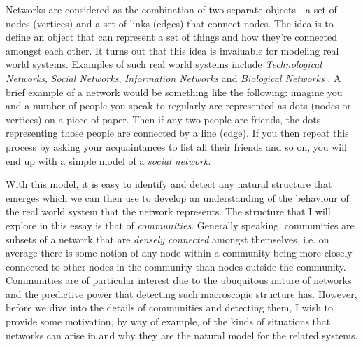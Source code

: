 Networks are considered as the combination of two separate objects - a set of nodes (vertices) and a set of links (edges) that connect nodes. The idea is to define an object that can represent a set of things and how they're connected amongst each other. It turns out that this idea is invaluable for modeling real world systems. Examples of such real world systems include \emph{Technological Networks}, \emph{Social Networks}, \emph{Information Networks} and \emph{Biological Networks} \cite[Contents]{newman10}. A brief example of a network would be something like the following: imagine you and a number of people you speak to regularly are represented as dots (nodes or vertices) on a piece of paper. Then if any two people are friends, the dots representing those people are connected by a line (edge). If you then repeat this process by asking your acquaintances to list all their friends and so on, you will end up with a simple model of a \emph{social network}.

With this model, it is easy to identify and detect any natural structure that emerges which we can then use to develop an understanding of the behaviour of the real world system that the network represents. The structure that I will explore in this essay is that of \emph{communities}. Generally speaking, communities are subsets of a network that are \emph{densely connected} amongst themselves\label{copy:community_intuition}, i.e. on average there is some notion of any node within a community being more closely connected to other nodes in the community than nodes outside the community. Communities are of particular interest due to the ubuquitous nature of networks and the predictive power that detecting such macroscopic structure has. However, before we dive into the details of communities and detecting them, I wish to provide some motivation, by way of example, of the kinds of situations that networks can arise in and why they are the natural model for the related systems.

